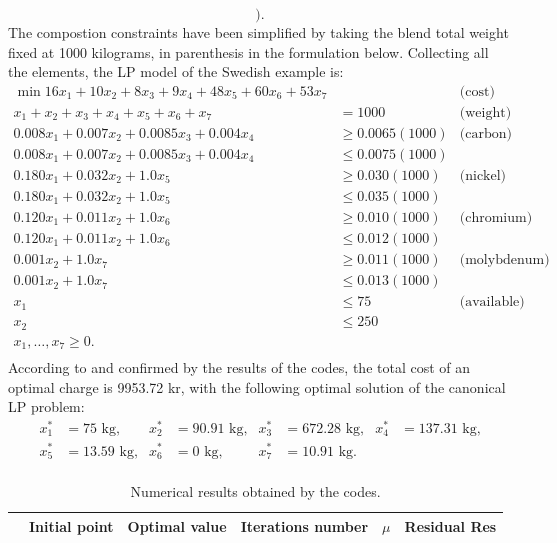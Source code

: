 \documentclass[a4paper,10 pt,titlepage,twoside]{book}
\theoremstyle{plain}
\theoremstyle{definition}
\theoremstyle{remark}
\begin{document}
{{\begin{equation*}
	\Bigg).
\end{equation*}		
The compostion constraints have been simplified by taking the blend total weight fixed at 1000 kilograms, in parenthesis in the formulation below. Collecting all the elements, the LP model of the Swedish example is: 
\begin{align*}
\min16x_{1}+10x_{2}+8x_{3}+9x_{4}+48x_{5}+60x_{6}+53x_{7}& &\text{(cost)}&\\
x_{1}+x_{2}+x_{3}+x_{4}+x_{5}+x_{6} + x_{7}&= 1000&\text{(weight)}&\\
0.008x_{1}+0.007x_{2}+0.0085x_{3}+0.004x_{4}&\geq 0.0065(1000)&\text{(carbon)}&\\
0.008x_{1}+0.007x_{2} + 0.0085x_{3} + 0.004x_{4}&\leq 0.0075(1000)&\\
0.180x_{1}+0.032x_{2} + 1.0x_{5}&\geq 0.030(1000)& \text{(nickel)}&\\
0.180x_{1}+0.032x_{2} + 1.0x_{5}&\leq 0.035(1000)&\\
0.120x_{1}+0.011x_{2} + 1.0x_{6}&\geq 0.010(1000)& \text{(chromium)}&\\
0.120x_{1}+0.011x_{2} + 1.0x_{6}&\leq 0.012(1000)&\\
0.001x_{2} + 1.0x_{7}&\geq 0.011(1000)& \text{(molybdenum)}&\\
0.001x_{2} + 1.0x_{7}&\leq 0.013(1000)&\\
x_{1}&\leq 75&\text{(available)}&\\
x_{2}&\leq 250 &&\\
x_{1},\dots, x_{7}\geq 0.\\
\end{align*}
According to \cite{RR} and confirmed by the results of the codes, the total cost of an optimal charge is 9953.72 kr, with the following optimal solution of the canonical LP problem:
\begin{align*}
x_{1}^{*} &=  75\text{ kg,} & x_{2}^{*}&=  90.91\text{ kg,} & x_{3}^{*} &= 672.28 \text{ kg,} & x_{4}^{*} &= 137.31 \text{ kg,}\\
x_{5}^{*} &= 13.59 \text{ kg,}& x_{6}^{*}&= 0\text{ kg,}  & x_{7}^{*} &= 10.91 \text{ kg.} &&\\
\end{align*}
\begin{table}[t]\caption{\label{table:SWE}Numerical results obtained by the codes.}
	\begin{tabular}{cclcll}
		\hline		\textbf{} & \textbf{Initial point} & \multicolumn{1}{c}{\textbf{Optimal value}} & \textbf{Iterations number} & \multicolumn{1}{c}{\textbf{$\mu$}} & \multicolumn{1}{c}{\textbf{Residual} Res} \\ \hline

\end{tabular}
\end{table}}}
\end{document}

